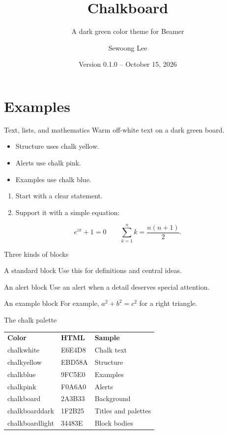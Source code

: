 \documentclass[aspectratio=169,11pt]{beamer}
\title[Chalkboard]{Chalkboard}
\subtitle{A dark green color theme for Beamer}
\author{Sewoong Lee}
\date{Version 0.1.0 -- October 15, 2026}
\begin{document}
\begin{frame}
\titlepage
\end{frame}
\section{Examples}
\begin{frame}{Text, lists, and mathematics}
Warm off-white text on a dark green board.
\begin{itemize}
\item Structure uses chalk yellow.
\item \alert{Alerts use chalk pink.}
\item {Examples use chalk blue.}
\end{itemize}
\begin{enumerate}
\item Start with a clear statement.
\item Support it with a simple equation:
\end{enumerate}
\[ e^{i\pi}+1=0 \qquad \sum_{k=1}^{n}k=\frac{n(n+1)}{2}. \]
\end{frame}
\begin{frame}{Three kinds of blocks}
\begin{block}{A standard block}
Use this for definitions and central ideas.
\end{block}
\begin{alertblock}{An alert block}
Use an alert when a detail deserves special attention.
\end{alertblock}
\begin{exampleblock}{An example block}
For example, $a^2+b^2=c^2$ for a right triangle.
\end{exampleblock}
\end{frame}
\begin{frame}{The chalk palette}
\centering
\renewcommand{\arraystretch}{1.4}
\begin{tabular}{lll}
\textbf{Color} & \textbf{HTML} & \textbf{Sample}\\
chalkwhite & E6E4D8 & \textcolor{chalkwhite}{Chalk text}\\
chalkyellow & EBD58A & \textcolor{chalkyellow}{Structure}\\
chalkblue & 9FC5E0 & \textcolor{chalkblue}{Examples}\\
chalkpink & F0A6A0 & \textcolor{chalkpink}{Alerts}\\
chalkboard & 2A3B33 & Background\\
chalkboarddark & 1F2B25 & Titles and palettes\\
chalkboardlight & 34483E & Block bodies
\end{tabular}
\end{frame}
\end{document}
